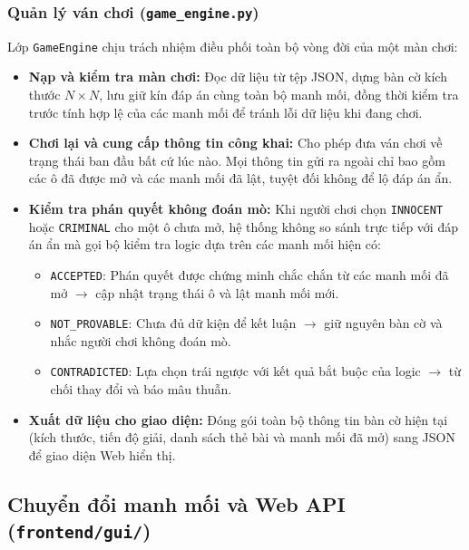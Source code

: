 \subsubsection{Quản lý ván chơi (\texttt{game\_engine.py})}
Lớp \texttt{GameEngine} chịu trách nhiệm điều phối toàn bộ vòng đời của một màn chơi:
\begin{itemize}
    \item \textbf{Nạp và kiểm tra màn chơi:} Đọc dữ liệu từ tệp JSON, dựng bàn cờ kích thước $N \times N$, lưu giữ kín đáp án cùng toàn bộ manh mối, đồng thời kiểm tra trước tính hợp lệ của các manh mối để tránh lỗi dữ liệu khi đang chơi.
    \item \textbf{Chơi lại và cung cấp thông tin công khai:} Cho phép đưa ván chơi về trạng thái ban đầu bất cứ lúc nào. Mọi thông tin gửi ra ngoài chỉ bao gồm các ô đã được mở và các manh mối đã lật, tuyệt đối không để lộ đáp án ẩn.
    \item \textbf{Kiểm tra phán quyết không đoán mò:} Khi người chơi chọn \texttt{INNOCENT} hoặc \texttt{CRIMINAL} cho một ô chưa mở, hệ thống không so sánh trực tiếp với đáp án ẩn mà gọi bộ kiểm tra logic dựa trên các manh mối hiện có:
    \begin{itemize}
        \item \texttt{ACCEPTED}: Phán quyết được chứng minh chắc chắn từ các manh mối đã mở $\rightarrow$ cập nhật trạng thái ô và lật manh mối mới.
        \item \texttt{NOT\_PROVABLE}: Chưa đủ dữ kiện để kết luận $\rightarrow$ giữ nguyên bàn cờ và nhắc người chơi không đoán mò.
        \item \texttt{CONTRADICTED}: Lựa chọn trái ngược với kết quả bắt buộc của logic $\rightarrow$ từ chối thay đổi và báo mâu thuẫn.
    \end{itemize}
    \item \textbf{Xuất dữ liệu cho giao diện:} Đóng gói toàn bộ thông tin bàn cờ hiện tại (kích thước, tiến độ giải, danh sách thẻ bài và manh mối đã mở) sang JSON để giao diện Web hiển thị.
\end{itemize}

\subsection{Chuyển đổi manh mối và Web API (\texttt{frontend/gui/})}

